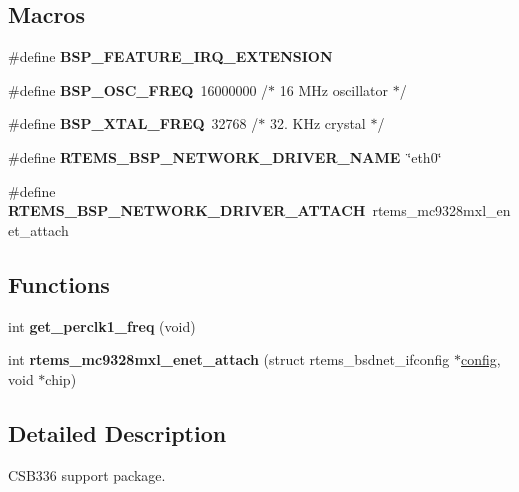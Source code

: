 \subsection*{Macros}
\begin{DoxyCompactItemize}
\item 
\mbox{\label{group__RTEMSBSPsARMCSB336_ga5d7d631d3a14b7554160f14eb42f351b}} 
\#define {\bfseries B\+S\+P\+\_\+\+F\+E\+A\+T\+U\+R\+E\+\_\+\+I\+R\+Q\+\_\+\+E\+X\+T\+E\+N\+S\+I\+ON}
\item 
\mbox{\label{group__RTEMSBSPsARMCSB336_gad07ed248b4d9108c92d0f80786ec17ab}} 
\#define {\bfseries B\+S\+P\+\_\+\+O\+S\+C\+\_\+\+F\+R\+EQ}~16000000    /$\ast$ 16 M\+Hz oscillator $\ast$/
\item 
\mbox{\label{group__RTEMSBSPsARMCSB336_ga7f8b162d8568fece46133c59f3471925}} 
\#define {\bfseries B\+S\+P\+\_\+\+X\+T\+A\+L\+\_\+\+F\+R\+EQ}~32768       /$\ast$ 32. K\+Hz crystal $\ast$/
\item 
\mbox{\label{group__RTEMSBSPsARMCSB336_ga86d4f9aa98431100692e31068070a8df}} 
\#define {\bfseries R\+T\+E\+M\+S\+\_\+\+B\+S\+P\+\_\+\+N\+E\+T\+W\+O\+R\+K\+\_\+\+D\+R\+I\+V\+E\+R\+\_\+\+N\+A\+ME}~\char`\"{}eth0\char`\"{}
\item 
\mbox{\label{group__RTEMSBSPsARMCSB336_gadde0d66aef9442971dde465292ac14e6}} 
\#define {\bfseries R\+T\+E\+M\+S\+\_\+\+B\+S\+P\+\_\+\+N\+E\+T\+W\+O\+R\+K\+\_\+\+D\+R\+I\+V\+E\+R\+\_\+\+A\+T\+T\+A\+CH}~rtems\+\_\+mc9328mxl\+\_\+enet\+\_\+attach
\end{DoxyCompactItemize}
\subsection*{Functions}
\begin{DoxyCompactItemize}
\item 
\mbox{\label{group__RTEMSBSPsARMCSB336_gab1cccc6d72c35777b9cd43e97ef2fcbd}} 
int {\bfseries get\+\_\+perclk1\+\_\+freq} (void)
\item 
\mbox{\label{group__RTEMSBSPsARMCSB336_gaf09608b4b0732ba530b9af82f3a07548}} 
int {\bfseries rtems\+\_\+mc9328mxl\+\_\+enet\+\_\+attach} (struct rtems\+\_\+bsdnet\+\_\+ifconfig $\ast$\mbox{\hyperlink{structconfig__s}{config}}, void $\ast$chip)
\end{DoxyCompactItemize}


\subsection{Detailed Description}
C\+S\+B336 support package. 

